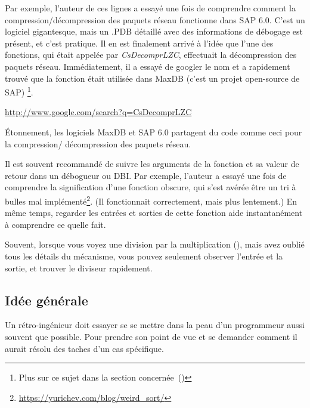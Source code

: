 
Par exemple, l'auteur de ces lignes a essayé une fois de comprendre comment la compression/décompression
des paquets réseau fonctionne dans SAP 6.0.
C'est un logiciel gigantesque, mais un .\gls{PDB} détaillé avec des informations
de débogage est présent, et c'est pratique.
Il en est finalement arrivé à l'idée que l'une des fonctions, qui était appelée par
\emph{CsDecomprLZC}, effectuait la décompression des paquets réseau.
Immédiatement, il a essayé de googler le nom et a rapidement trouvé que la fonction
était utilisée dans MaxDB (c'est un projet open-source de SAP)
\footnote{Plus sur ce sujet dans la section concernée~()}.

\url{http://www.google.com/search?q=CsDecomprLZC}

Étonnement, les logiciels MaxDB et SAP 6.0 partagent du code comme ceci pour la compression/
décompression des paquets réseau.


Il est souvent recommandé de suivre les arguments de la fonction et sa valeur de
retour dans un débogueur ou \ac{DBI}.
Par exemple, l'auteur a essayé une fois de comprendre la signification d'une fonction
obscure, qui s'est avérée être un tri à bulles mal implémenté\footnote{\url{https://yurichev.com/blog/weird_sort/}}.
(Il fonctionnait correctement, mais plus lentement.)
En même temps, regarder les entrées et sorties de cette fonction aide instantanément
à comprendre ce quelle fait.

Souvent, lorsque vous voyez une division par la multiplication (),
mais avez oublié tous les détails du mécanisme, vous pouvez seulement observer l'entrée
et la sortie, et trouver le diviseur rapidement.




\subsection{Idée générale}

Un rétro-ingénieur doit essayer se se mettre dans la peau d'un programmeur aussi
souvent que possible.
Pour prendre son point de vue et se demander comment il aurait résolu des taches
d'un cas spécifique.

